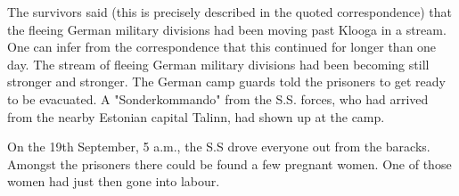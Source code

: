\documentclass{article}
\begin{document}
\begin{pairs}
\begin{Leftside}
\begin{english}
The survivors said (this is precisely described in the quoted correspondence) that the fleeing German military
divisions had been moving past Klooga in a stream. One can infer from the correspondence that this continued 
for longer than one day. The stream of fleeing German military divisions had been becoming still stronger and
stronger. The German camp guards told the prisoners to get ready to be evacuated. A "Sonderkommando"
from the S.S. forces, who had arrived from the nearby Estonian capital Talinn, had shown up at the camp.

On the 19th September, 5 a.m., the S.S drove everyone out from the baracks. Amongst the prisoners there could be found
a few pregnant women. One of those women had just then gone into labour.

\endnumbering
\end{english}
\end{Leftside}

\end{pairs}
\Columns
\end{document}
